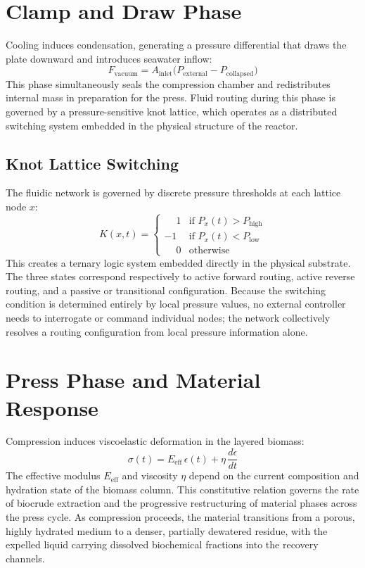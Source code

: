 \documentclass[12pt, a4paper]{article}
\begin{document}
\section{Clamp and Draw Phase}

Cooling induces condensation, generating a pressure differential that draws the plate downward and introduces seawater inflow:
\[
F_{\text{vacuum}} = A_{\text{inlet}} \bigl(P_{\text{external}} - P_{\text{collapsed}}\bigr)
\]
This phase simultaneously seals the compression chamber and redistributes internal mass in preparation for the press. Fluid routing during this phase is governed by a pressure-sensitive knot lattice, which operates as a distributed switching system embedded in the physical structure of the reactor.

\subsection{Knot Lattice Switching}

The fluidic network is governed by discrete pressure thresholds at each lattice node $x$:
\[
K(x,t) =
\begin{cases}
\phantom{-}1 & \text{if } P_x(t) > P_{\text{high}} \\
-1 & \text{if } P_x(t) < P_{\text{low}} \\
\phantom{-}0 & \text{otherwise}
\end{cases}
\]
This creates a ternary logic system embedded directly in the physical substrate. The three states correspond respectively to active forward routing, active reverse routing, and a passive or transitional configuration. Because the switching condition is determined entirely by local pressure values, no external controller needs to interrogate or command individual nodes; the network collectively resolves a routing configuration from local pressure information alone.

\section{Press Phase and Material Response}

Compression induces viscoelastic deformation in the layered biomass:
\[
\sigma(t) = E_{\text{eff}}\, \epsilon(t) + \eta\, \frac{d\epsilon}{dt}
\]
The effective modulus $E_{\text{eff}}$ and viscosity $\eta$ depend on the current composition and hydration state of the biomass column. This constitutive relation governs the rate of biocrude extraction and the progressive restructuring of material phases across the press cycle. As compression proceeds, the material transitions from a porous, highly hydrated medium to a denser, partially dewatered residue, with the expelled liquid carrying dissolved biochemical fractions into the recovery channels.
\end{document}

